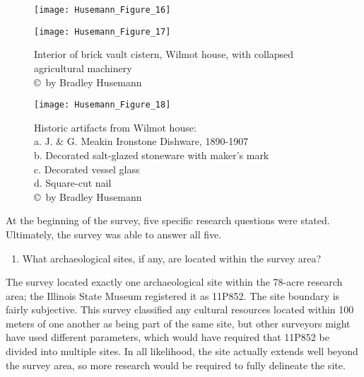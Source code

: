 \begin{figure}[!t]
\begin{minipage}[t]{.49\linewidth}
	\texttt{[image: Husemann\_Figure\_16]}
	\caption{Cellar pit, Wilmot house, viewshed facing southeast, with cistern in background
		{\normalfont\scriptsize \\ \copyright\ by Bradley Husemann
	}}
	\label{fig:Husemann_Figure_16}
\end{minipage}
\hfill
\begin{minipage}[t]{.49\linewidth}
	\texttt{[image: Husemann\_Figure\_17]}
	\caption{Interior of brick vault cistern, Wilmot house, with collapsed agricultural machinery
		{\normalfont\scriptsize \\ \copyright\ by Bradley Husemann
	}}
	\label{fig:Husemann_Figure_17}
\end{minipage}
\end{figure}

\begin{wrapfigure}{O}[3cm]{0.5\textwidth}
	\texttt{[image: Husemann\_Figure\_18]}
	\caption{Historic artifacts from Wilmot house:\\
		a.	J. \& G. Meakin Ironstone Dishware, 1890-1907\\
		b.	Decorated salt-glazed stoneware with maker’s mark\\
		c.	Decorated vessel glass\\
		d.	Square-cut nail
		{\normalfont\scriptsize \\ \copyright\ by Bradley Husemann
	}}
	\label{fig:Husemann_Figure_18}
\end{wrapfigure}


At the beginning of the survey, five specific research questions were stated. Ultimately, the survey was able to answer all five.

\begin{enumerate}
	\item What archaeological sites, if any, are located within the survey area?
\end{enumerate}

The survey located exactly one archaeological site within the 78-acre research area; the Illinois State Museum registered it as 11P852. The site boundary is fairly subjective. This survey classified any cultural resources located within 100 meters of one another as being part of the same site, but other surveyors might have used different parameters, which would have required that 11P852 be divided into multiple sites. In all likelihood, the site actually extends well beyond the survey area, so more research would be required to fully delineate the site.

